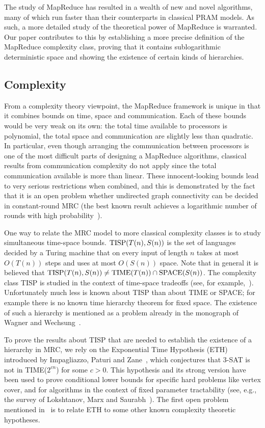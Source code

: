 \documentclass[letterpaper,USenglish]{lipics}
\theoremstyle{definition}
\theoremstyle{remark}
\newcommand{\SPACE}{\textup{SPACE}}
\newcommand{\TIME}{\textup{TIME}}
\newcommand{\TISP}{\textup{TISP}}
\begin{document}
The study of MapReduce has resulted in a wealth of new and novel algorithms,
many of which run faster than their counterparts in classical PRAM models. As
such, a more detailed study of the theoretical power of MapReduce is warranted.
Our paper contributes to this by establishing a more precise definition of the
MapReduce complexity class, proving that it contains sublogarithmic
deterministic space and showing the existence of certain kinds of hierarchies.

\subsection{Complexity}

From a complexity theory viewpoint, the MapReduce framework is unique in that
it combines bounds on time, space and communication. Each of these bounds would
be very weak on its own: the total time available to processors is polynomial,
the total space and communication are slightly less than quadratic.  In
particular, even though arranging the communication between processors is one
of the most difficult parts of designing a MapReduce algorithms, classical
results from communication complexity do not apply since the total
communication available is more than linear. These innocent-looking bounds lead
to very serious restrictions when combined, and this is demonstrated by the
fact that it is an open problem whether undirected graph connectivity can be
decided in constant-round MRC (the best known result achieves a logarithmic
number of rounds with high probability~\cite{Karloff10}).

One way to relate the MRC model to more classical complexity classes is to
study simultaneous time-space bounds.  $\TISP(T(n),S(n))$ is the set of
languages decided by a Turing machine that on every input of length $n$ takes
at most $O(T(n))$ steps and uses at most $O(S(n))$ space.  Note that in general
it is believed that $\TISP(T(n), S(n)) \neq \TIME(T(n)) \cap \SPACE(S(n))$.
The complexity class TISP is studied in the context of time-space tradeoffs
(see, for example,~\cite{Fortnow00, Williams08}).  Unfortunately much less is
known about TISP than about TIME or SPACE; for example there is no known time
hierarchy theorem for fixed space. The existence of such a hierarchy is
mentioned as a problem already in the monograph of Wagner and
Wechsung~\cite{WagnerW86}.

To prove the results about TISP that are needed to establish the existence of a
hierarchy in MRC, we rely on the Exponential Time Hypothesis (ETH) introduced
by Impagliazzo, Paturi and Zane~\cite{ImpagliazzoP99,ImpagliazzoPZ01},
which conjectures that 3-SAT is not in TIME($2^{cn}$) for some $c>0$. This
hypothesis and its strong version have been used to prove conditional lower
bounds for specific hard problems like vertex cover, and for algorithms in the
context of fixed parameter tractability (see, e.g., the survey of Lokshtanov,
Marx and Saurabh~\cite{LokshtanovMS11}). The first open problem mentioned
in~\cite{LokshtanovMS11} is to relate ETH to some other known complexity
theoretic hypotheses.
\end{document}
